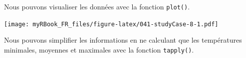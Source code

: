 \documentclass[]{book}
\newenvironment{Shaded}{\begin{snugshade}}{\end{snugshade}}
\newcommand{\DataTypeTok}[1]{\textcolor[rgb]{0.13,0.29,0.53}{#1}}
\newcommand{\DecValTok}[1]{\textcolor[rgb]{0.00,0.00,0.81}{#1}}
\newcommand{\KeywordTok}[1]{\textcolor[rgb]{0.13,0.29,0.53}{\textbf{#1}}}
\newcommand{\NormalTok}[1]{#1}
\newcommand{\OperatorTok}[1]{\textcolor[rgb]{0.81,0.36,0.00}{\textbf{#1}}}
\newcommand{\StringTok}[1]{\textcolor[rgb]{0.31,0.60,0.02}{#1}}
\begin{document}
Nous pouvons visualiser les données avec la fonction \texttt{plot()}.

\begin{Shaded}
\end{Shaded}

\texttt{[image: myRBook\_FR\_files/figure-latex/041-studyCase-8-1.pdf]}

Nous pouvons simplifier les informations en ne calculant que les températures minimales, moyennes et maximales avec la fonction \texttt{tapply()}.
\end{document}

